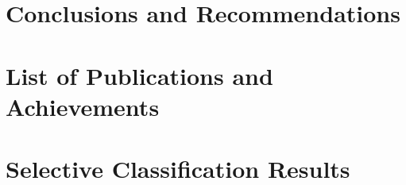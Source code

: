 \documentclass[12pt]{report}
\begin{document}
	
	\chapter{Conclusions and Recommendations}
	\label{ch:conclusion_and_discussion}
	
	
	
	
	\clearpage
	\renewcommand{\bibname}{References}
	
	
	
	\begin{appendices}
		\chapter{List of Publications and Achievements}
		\label{app:list_of_publications}
		
		
		\chapter{Selective Classification Results}
		\label{app:selective_classification_results}
		
		
	\end{appendices}
	
\end{document}
